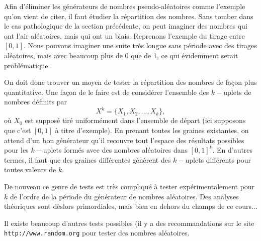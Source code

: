 \documentclass[a4paper,12pt]{book}
\begin{document}
Afin d'éliminer les générateurs de nombres pseudo-aléatoires comme l'exemple qu'on 
vient de citer, il faut étudier la répartition des nombres. Sans tomber dans le cas pathologique de la section
précédente, on peut imaginer des nombres qui ont l'air aléatoires, mais qui ont un biais. 
Reprenons l'exemple du tirage entre $[0,1]$. Nous pouvons imaginer une suite très longue 
sans période avec des tirages aléatoires, mais avec beaucoup plus de 0 que de 1, ce qui évidemment serait problématique.

On doit donc trouver un moyen de tester la répartition des nombres de façon plus quantitative.
Une façon de le faire est de considérer l'ensemble des $k-$uplets de nombres définits par
\begin{equation}
 X^k=\{X_1,X_2, ..., X_k\},
\end{equation}
où $X_0$ est supposé tiré uniformément dans l'ensemble de départ (ici supposons que c'est $[0,1]$ à titre d'exemple).
En prenant toutes les graines existantes, on attend d'un bon générateur qu'il recouvre tout l'espace des résultats possibles
pour les $k-$uplets formés avec des nombres aléatoires dans $[0,1]^k$. En d'autres termes, il faut que des graines différentes
génèrent des $k-$uplets différents pour toutes valeurs de $k$. 

De nouveau ce genre de tests est très compliqué à tester expérimentalement pour $k$ de l'ordre de la période 
du générateur de nombres aléatoires. Des analyses théoriques sont dèslors primordiales, mais bien en dehors 
du champs de ce cours...

Il existe beaucoup d'autres tests possibles (il y a des recommandations sur le site \texttt{http://www.random.org} 
pour tester des nombres aléatoires. 
\end{document}
